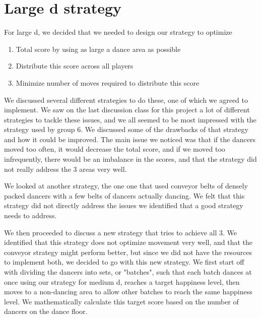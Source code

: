 \documentclass[a4paper,11pt,titlepage]{article}
\begin{document}
\section{Large d strategy}
For large d, we decided that we needed to design our strategy to optimize 
\begin{enumerate}
\item Total score by using as large a dance area as possible
\item Distribute this score across all players
\item Minimize number of moves required to distribute this score
\end{enumerate}

We discussed several different strategies to do these, one of which we agreed to implement. We saw on the last discussion class for this project a lot of different strategies to tackle these issues, and we all seemed to be most impressed with the strategy used by group 6. We discussed some of the drawbacks of that strategy and how it could be improved. The main issue we noticed was that if the dancers moved too often, it would decrease the total score, and if we moved too infrequently, there would be an imbalance in the scores, and that the strategy did not really address the 3 areas very well. 

We looked at another strategy, the one one that used conveyor belts of densely packed dancers with a few belts of dancers actually dancing. We felt that this strategy did not directly address the issues we identified that a good strategy needs to address.

We then proceeded to discuss a new strategy that tries to achieve all 3. We identified that this strategy does not optimize movement very well, and that the conveyor strategy might perform better, but since we did not have the resources to implement both, we decided to go with this new strategy. We first start off with dividing the dancers into sets, or "batches", such that each batch dances at once using our strategy for medium d, reaches a target happiness level, then moves to a non-dancing area to allow other batches to reach the same happiness level. We mathematically calculate this target score based on the number of dancers on the dance floor.
\end{document}
